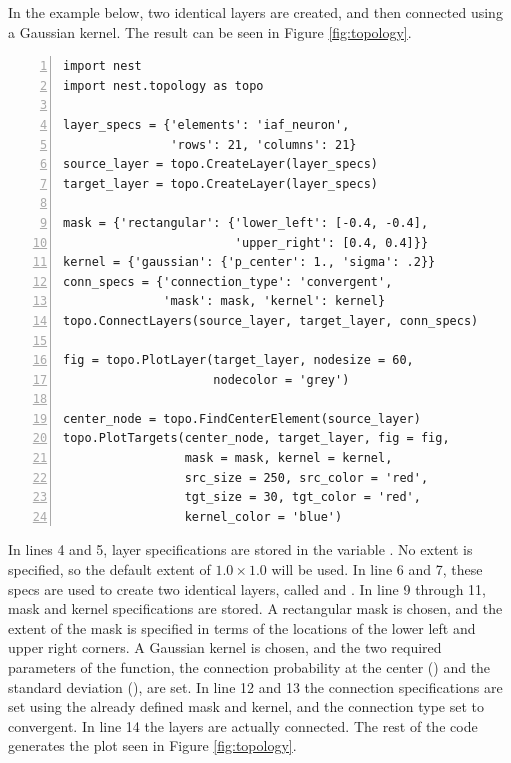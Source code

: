 In the example below, two identical layers are created, and then connected using a Gaussian kernel. The result can be seen in Figure \ref{fig:topology}.
\begin{lstlisting}[numbers=left]
import nest
import nest.topology as topo

layer_specs = {'elements': 'iaf_neuron', 
               'rows': 21, 'columns': 21}
source_layer = topo.CreateLayer(layer_specs)
target_layer = topo.CreateLayer(layer_specs)

mask = {'rectangular': {'lower_left': [-0.4, -0.4], 
                        'upper_right': [0.4, 0.4]}}
kernel = {'gaussian': {'p_center': 1., 'sigma': .2}}
conn_specs = {'connection_type': 'convergent', 
              'mask': mask, 'kernel': kernel}
topo.ConnectLayers(source_layer, target_layer, conn_specs)

fig = topo.PlotLayer(target_layer, nodesize = 60, 
                     nodecolor = 'grey')
 
center_node = topo.FindCenterElement(source_layer)
topo.PlotTargets(center_node, target_layer, fig = fig,
                 mask = mask, kernel = kernel,
                 src_size = 250, src_color = 'red',
                 tgt_size = 30, tgt_color = 'red',
                 kernel_color = 'blue')
\end{lstlisting}

In lines 4 and 5, layer specifications are stored in the variable . No extent is specified, so the default extent of $1.0 \times 1.0$ will be used. In line 6 and 7, these specs are used to create two identical layers, called  and . In line 9 through 11, mask and kernel specifications are stored. A rectangular mask is chosen, and the extent of the mask is specified in terms of the locations of the lower left and upper right corners. A Gaussian kernel is chosen, and the two required parameters of the function, the connection probability at the center () and the standard deviation (), are set. In line 12 and 13 the connection specifications are set using the already defined mask and kernel, and the connection type set to convergent. In line 14 the layers are actually connected. The rest of the code generates the plot seen in Figure \ref{fig:topology}. 

